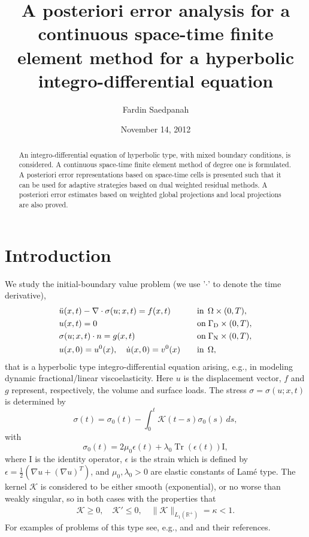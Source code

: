 \documentclass{amsart}
\title[A posteriori estimates for cGM for an  
integro-differential eq.]
{\textbf{A posteriori error analysis for a continuous space-time 
finite element method for a hyperbolic integro-differential equation}}
\author[F.~Saedpanah]{Fardin Saedpanah}
\numberwithin{equation}{section}
\theoremstyle{definition}
\begin{document}
\begin{abstract}
An integro-differential equation of hyperbolic type, 
with mixed boundary conditions, is considered. 
A continuous space-time finite element method of degree one 
is formulated. 
A posteriori error representations based on space-time cells is
presented such that it can be used for adaptive strategies based
on dual weighted residual methods.
A posteriori error estimates based on weighted global 
projections and local projections are also proved.
\end{abstract}

\date{November 14, 2012}

\maketitle

\section{{\bf Introduction}}
We study the initial-boundary value problem  
(we use '$\cdot$' to denote the time derivative),
\begin{align}   \label{problem}
  \begin{aligned}
    &\ddot u(x,t)-\nabla\cdot\sigma(u;x,t)=f(x,t) 
      \quad && \textrm{in} \;\,\Omega\times (0,T),\\
    &u(x,t)=0 \quad&& \textrm{on}\;\Gamma_\text{D}\times (0,T),\\
    &\sigma(u;x,t)\cdot n=g(x,t)
      \quad&&\textrm{on}\;\Gamma_{\text N}\times (0,T),\\
    &u(x,0)=u^0(x),\quad\dot{u}(x,0)=v^0(x)
      \quad&&\textrm{in}\;\,\Omega,
  \end{aligned}
\end{align}
that is a hyperbolic type integro-differential equation arising, e.g., 
in modeling dynamic fractional/linear viscoelasticity. 
Here $u$ is the displacement vector, $f$ and $g$ represent, 
respectively, the volume and surface loads.
The stress $\sigma=\sigma(u;x,t)$ is determined by
\begin{equation*}
  \sigma(t)=\sigma_0(t)-\int_0^t\!{\mathcal K}(t-s)\sigma_0(s)\,ds,
\end{equation*}
with
\begin{equation*}
  \sigma_0(t)=2\mu_0 \epsilon(t)+\lambda_0 \operatorname{Tr} (\epsilon(t))\text{I},
\end{equation*}
where $\text{I}$ is the identity operator,
$\epsilon$ is the strain which is defined by 
$\epsilon=\frac{1}{2}(\nabla u+(\nabla u)^T)$, and
$\mu_0,\lambda_0>0$ are elastic constants of Lam\'e type.
The kernel ${\mathcal K}$ is considered to be either smooth (exponential), 
or no worse than weakly singular, so in both cases with the properties that
\begin{align}  \label{KernelProperty}
  {\mathcal K}\geq 0,\quad {\mathcal K}' \leq 0, \quad \|{\mathcal K}\|_{L_1(\mathbb{R}^+)}=\kappa<1.
\end{align}
For examples of problems of this type see, e.g., \cite{StigFardin} 
and \cite{RiviereShawWhiteman2007} and their references. 
\end{document}
